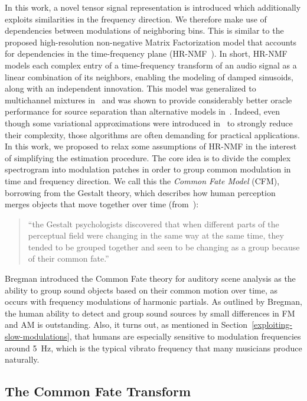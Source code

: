 In this work, a novel tensor signal representation is introduced which additionally exploits similarities in the frequency direction.
We therefore make use of dependencies between modulations of neighboring bins.
This is similar to the proposed high-resolution non-negative Matrix Factorization model that accounts for dependencies in the time-frequency plane (HR-NMF~\cite{badeau11}).
In short, HR-NMF models each complex entry of a time-frequency transform of an audio signal as a linear combination of its neighbors, enabling the modeling of damped sinusoids, along with an independent innovation.
This model was generalized to multichannel mixtures in~\cite{badeau13a, badeau14} and was shown to provide considerably better oracle performance for source separation than alternative models in~\cite{magron15a}.
Indeed, even though some variational approximations were introduced in~\cite{badeau13} to strongly reduce their complexity, those algorithms are often demanding for practical applications.
In this work, we proposed to relax some assumptions of HR-NMF in the interest of simplifying the estimation procedure.
The core idea is to divide the complex spectrogram into modulation patches in order to group common modulation in time and frequency direction.
We call this the \emph{Common Fate Model} (CFM), borrowing from the Gestalt theory, which describes how human perception merges objects that move together over time (from~\cite{bregman90}):

\begin{quote}
``the Gestalt psychologists discovered that when different parts of the perceptual field were changing in the same way at the same time, they tended to be grouped together and seen to be changing as a group because of their common fate.'' 
\end{quote}

Bregman introduced the Common Fate theory for auditory scene analysis as the ability to group sound objects based on their common motion over time, as occurs with frequency modulations of harmonic partials.
As outlined by Bregman, the human ability to detect and group sound sources by small differences in FM and AM is outstanding.
Also, it turns out, as mentioned in Section~\ref{exploiting-slow-modulations}, that humans are especially sensitive to modulation frequencies around 5~Hz, which is the typical vibrato frequency that many musicians produce naturally.

\subsection{The Common Fate Transform}
\label{sub:CFT}

